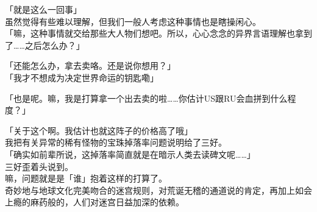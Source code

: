 「就是这么一回事」\\

虽然觉得有些难以理解，但我们一般人考虑这种事情也是瞎操闲心。\\

「嘛，这种事情就交给那些大人物们想吧。所以，心心念念的异界言语理解也拿到了……之后怎么办？」

「还能怎么办，拿去卖咯。还是说你想用？」\\

「我才不想成为决定世界命运的钥匙嘞」

「也是呢。嘛，我是打算拿一个出去卖的啦……你估计US跟RU会血拼到什么程度？」

「关于这个啊。我估计也就这阵子的价格高了哦」\\

我把有关异常的稀有怪物的宝珠掉落率问题说明给了三好。\\

「确实如前辈所说，这掉落率简直就是在暗示人类去读碑文呢……」\\

三好歪着头说到。\\

嘛，问题就是是「谁」抱着这样的打算了。\\

奇妙地与地球文化完美吻合的迷宫规则，对荒诞无稽的通道说的肯定，再加上如会上瘾的麻药般的，人们对迷宫日益加深的依赖。

